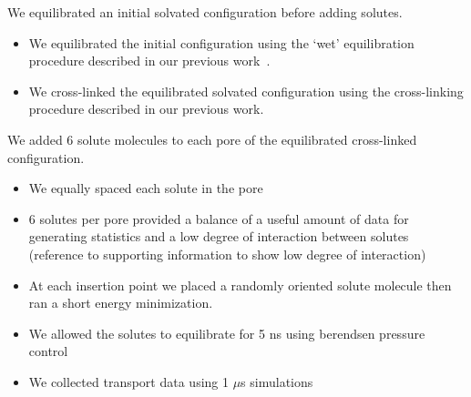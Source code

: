 \documentclass{article}
\begin{document}

  We equilibrated an initial solvated configuration before adding solutes.
  \begin{itemize}
	\item We equilibrated the initial configuration using the `wet'
	equilibration procedure described in our previous work~\cite{coscia_understanding_2019}.
	\item We cross-linked the equilibrated solvated configuration using the
	cross-linking procedure described in our previous work. 
  \end{itemize}

  We added 6 solute molecules to each pore of the equilibrated cross-linked
  configuration.
  \begin{itemize}
	\item We equally spaced each solute in the pore
	\item 6 solutes per pore provided a balance of a useful amount of data
	for generating statistics and a low degree of interaction between solutes (reference
	to supporting information to show low degree of interaction)
	\item At each insertion point we placed a randomly oriented solute molecule
	then ran a short energy minimization.
	\item We allowed the solutes to equilibrate for 5 ns using berendsen 
	pressure control
	\item We collected transport data using 1 $\mu$s simulations
  \end{itemize}
  
\end{document}
